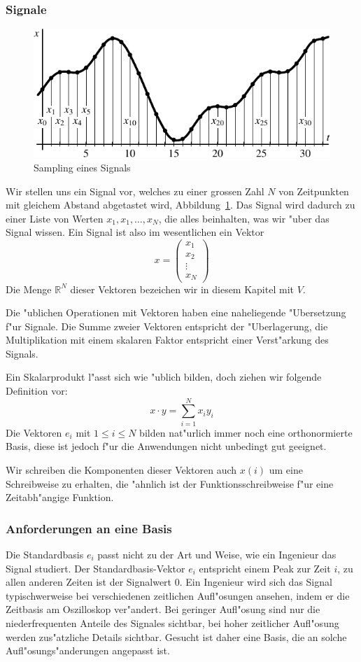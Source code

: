 \subsubsection{Signale}
\begin{figure}
\begin{center}
\includegraphics[width=0.9\hsize]{images/signal-1}
\end{center}
\caption{Sampling eines Signals\label{signal:vector}}
\end{figure}
Wir stellen uns ein Signal vor, welches zu einer grossen Zahl $N$
von Zeitpunkten mit gleichem Abstand abgetastet wird,
Abbildung~\ref{signal:vector}. Das Signal
wird dadurch zu einer Liste von Werten $x_1,x_1,\dots,x_N$, die
alles beinhalten, was wir "uber das Signal wissen. Ein Signal
ist also im wesentlichen ein Vektor
$$
x=\begin{pmatrix}x_1\\x_2\\\vdots\\x_N\end{pmatrix}
$$
Die Menge $\mathbb R^N$ dieser Vektoren bezeichen wir in diesem
Kapitel mit $V$. 

Die "ublichen Operationen mit Vektoren haben eine naheliegende
"Ubersetzung f"ur Signale. Die Summe zweier Vektoren entspricht
der "Uberlagerung, die Multiplikation mit einem skalaren Faktor
entspricht einer Verst"arkung des Signals. 

Ein Skalarprodukt l"asst sich wie "ublich bilden, doch ziehen
wir folgende Definition vor:
$$
x\cdot y=\sum_{i=1}^Nx_iy_i
$$
Die Vektoren $e_i$ mit $1\le i\le N$ bilden nat"urlich immer noch
eine orthonormierte Basis, diese ist jedoch f"ur die Anwendungen
nicht unbedingt gut geeignet.

Wir schreiben die Komponenten dieser Vektoren auch $x(i)$ um
eine Schreibweise zu erhalten, die "ahnlich ist der Funktionsschreibweise
f"ur eine Zeitabh"angige Funktion.

\subsubsection{Anforderungen an eine Basis}
Die Standardbasis $e_i$ passt nicht zu der Art und Weise, wie ein
Ingenieur das Signal studiert. Der Standardbasis-Vektor $e_i$
entspricht einem Peak zur Zeit $i$, zu allen anderen Zeiten
ist der Signalwert $0$.
Ein Ingenieur wird sich das Signal
typischwerweise bei verschiedenen zeitlichen Aufl"osungen
ansehen, indem er die Zeitbasis am Oszilloskop ver"andert.
Bei geringer Aufl"osung sind nur die niederfrequenten
Anteile des Signales sichtbar, bei hoher zeitlicher Aufl"osung
werden zus"atzliche Details sichtbar.
Gesucht ist daher eine Basis, die an solche Aufl"osungs"anderungen
angepasst ist.

